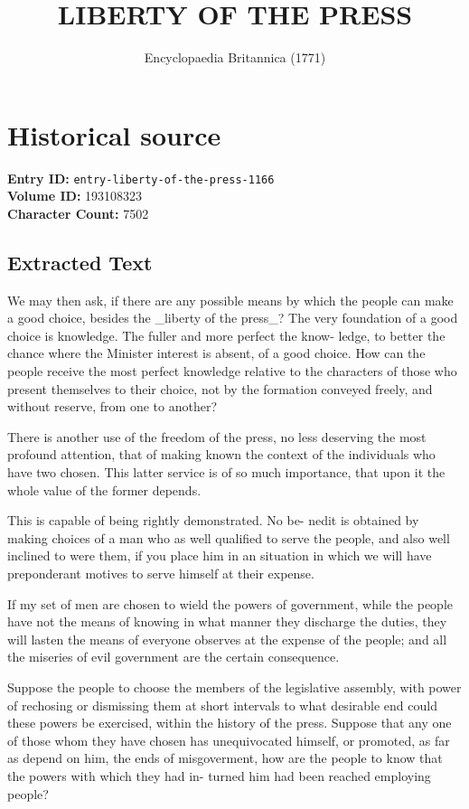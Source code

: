 \documentclass{article}
\title{LIBERTY OF THE PRESS}
\date{Encyclopaedia Britannica (1771)}
\begin{document}
\maketitle

\section*{Historical source}
\textbf{Entry ID:} \texttt{entry-liberty-of-the-press-1166} \\
\textbf{Volume ID:} 193108323 \\
\textbf{Character Count:} 7502

\subsection*{Extracted Text}
We may then ask, if there are any possible means by which the people can make a good choice, besides the \_liberty of the press\_? The very foundation of a good choice is knowledge. The fuller and more perfect the know- ledge, to better the chance where the Minister interest is absent, of a good choice. How can the people receive the most perfect knowledge relative to the characters of those who present themselves to their choice, not by the formation conveyed freely, and without reserve, from one to another?

There is another use of the freedom of the press, no less deserving the most profound attention, that of making known the context of the individuals who have two chosen. This latter service is of so much importance, that upon it the whole value of the former depends.

This is capable of being rightly demonstrated. No be- nedit is obtained by making choices of a man who as well qualified to serve the people, and also well inclined to were them, if you place him in an situation in which we will have preponderant motives to serve himself at their expense.

If my set of men are chosen to wield the powers of government, while the people have not the means of knowing in what manner they discharge the duties, they will lasten the means of everyone observes at the expense of the people; and all the miseries of evil government are the certain consequence.

Suppose the people to choose the members of the legislative assembly, with power of rechosing or dismissing them at short intervals to what desirable end could these powers be exercised, within the history of the press. Suppose that any one of those whom they have chosen has unequivocated himself, or promoted, as far as depend on him, the ends of misgoverment, how are the people to know that the powers with which they had in- turned him had been reached employing people?
\end{document}
